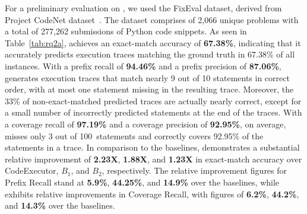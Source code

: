 For a preliminary evaluation on {\tool}, we used the FixEval dataset,
derived from Project CodeNet dataset~\cite{puri2021codenet}.
The dataset comprises of 2,066 unique problems with a total of 277,262
submissions of Python code snippets.
As seen in Table~\ref{tab:rq2a}, {\tool} achieves an exact-match
accuracy of \textbf{67.38\%}, indicating that it accurately predicts
execution traces matching the ground truth in 67.38\% of all
instances. With a prefix recall of \textbf{94.46\%} and a prefix
precision of \textbf{87.06\%}, {\tool} generates execution traces that
match nearly 9 out of 10 statements in correct order, with at most one
statement missing in the resulting trace. Moreover, the 33\% of
non-exact-matched predicted traces are actually nearly correct, except
for a small number of incorrectly predicted statements at the end of
the traces. With a coverage recall of \textbf{97.19\%} and a coverage
precision of \textbf{92.95\%}, on average, {\tool} misses only 3 out
of 100~state\-ments and correctly covers 92.95\% of the statements in
a trace.
%
In comparison to the baselines, {\tool} demonstrates a substantial
relative improvement of \textbf{2.23X}, \textbf{1.88X}, and
\textbf{1.23X} in exact-match accuracy over CodeExecutor, $B_1$, and
$B_2$, respectively. The relative improvement figures for Prefix
Recall stand at \textbf{5.9\%}, \textbf{44.25\%}, and \textbf{14.9\%}
over the baselines, while {\tool} exhibits relative improvements in
Coverage Recall, with figures of \textbf{6.2\%}, \textbf{44.2\%}, and
\textbf{14.3\%} over the baselines.



